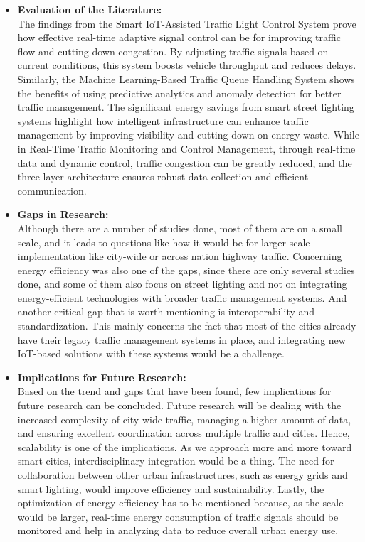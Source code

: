 \documentclass[12pt,a4paper]{article}
\begin{document}
\begin{itemize}
    \item \textbf{Evaluation of the Literature:}\\
    The findings from the Smart IoT-Assisted Traffic Light Control System prove how effective real-time adaptive signal control can be for improving traffic flow and cutting down congestion. By adjusting traffic signals based on current conditions, this system boosts vehicle throughput and reduces delays. Similarly, the Machine Learning-Based Traffic Queue Handling System shows the benefits of using predictive analytics and anomaly detection for better traffic management. The significant energy savings from smart street lighting systems highlight how intelligent infrastructure can enhance traffic management by improving visibility and cutting down on energy waste. While in Real-Time Traffic Monitoring and Control Management, through real-time data and dynamic control, traffic congestion can be greatly reduced, and the three-layer architecture ensures robust data collection and efficient communication.  
    
    \item \textbf{Gaps in Research:}\\
    
    Although there are a number of studies done, most of them are on a small scale, and it leads to questions like how it would be for larger scale implementation like city-wide or across nation highway traffic. Concerning energy efficiency was also one of the gaps, since there are only several studies done, and some of them also focus on street lighting and not on integrating energy-efficient technologies with broader traffic management systems. And another critical gap that is worth mentioning is interoperability and standardization. This mainly concerns the fact that most of the cities already have their legacy traffic management systems in place, and integrating new IoT-based solutions with these systems would be a challenge.  
    
    \item \textbf{Implications for Future Research:}\\
    
    Based on the trend and gaps that have been found, few implications for future research can be concluded. Future research will be dealing with the increased complexity of city-wide traffic, managing a higher amount of data, and ensuring excellent coordination across multiple traffic and cities. Hence, scalability is one of the implications. As we approach more and more toward smart cities, interdisciplinary integration would be a thing. The need for collaboration between other urban infrastructures, such as energy grids and smart lighting, would improve efficiency and sustainability. Lastly, the optimization of energy efficiency has to be mentioned because, as the scale would be larger, real-time energy consumption of traffic signals should be monitored and help in analyzing data to reduce overall urban energy use. 
\end{itemize}
\end{document}
